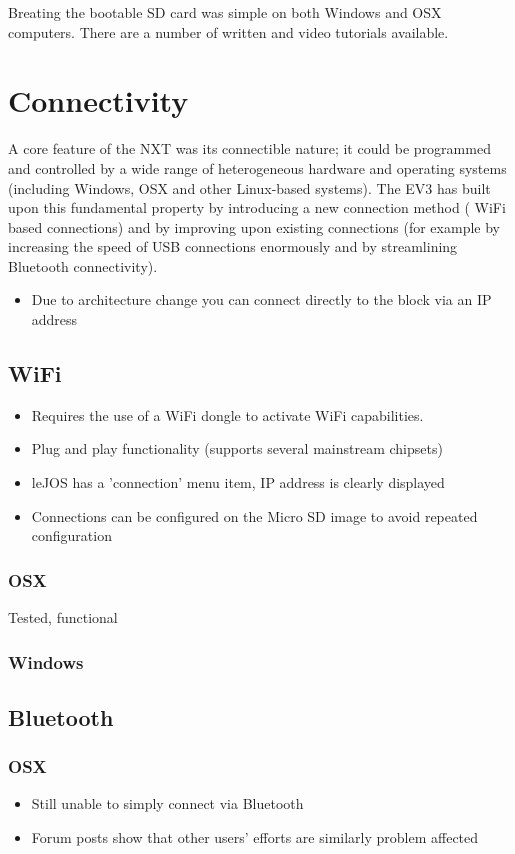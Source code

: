 \documentclass[11pt, a4paper, oneside]{article}
\begin{document}
	Breating the bootable SD card was simple on both Windows and OSX computers. There are a number of written and video tutorials available.
	
 	\section{Connectivity}
	A core feature of the NXT was its connectible nature; it could be programmed and controlled by a wide range of heterogeneous hardware and operating systems (including Windows, OSX and other Linux-based systems). The EV3 has built upon this fundamental property by introducing a new connection method ( WiFi based connections) and by improving upon existing connections (for example by increasing the speed of USB connections enormously and by streamlining Bluetooth connectivity).
   \begin{itemize}
    \item Due to architecture change you can connect directly to the block via an IP address
   \end{itemize}
 	\subsection{WiFi}
   \begin{itemize}
    \item Requires the use of a WiFi dongle to activate WiFi capabilities. 
    \item Plug and play functionality (supports several mainstream chipsets)
    \item leJOS has a 'connection' menu item, IP address is clearly displayed
    \item Connections can be configured on the Micro SD image to avoid repeated configuration
   \end{itemize}
 		\subsubsection{OSX}
			Tested, functional
 		\subsubsection{Windows}
 	\subsection{Bluetooth}
  		\subsubsection{OSX}
		\begin{itemize}
			\item Still unable to simply connect via Bluetooth
			\item Forum posts show that other users' efforts are similarly problem affected
		\end{itemize}
\end{document}

